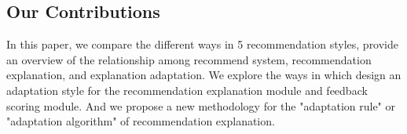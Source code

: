 \subsection{Our Contributions}
In this paper, we compare the different ways in 5 recommendation styles, provide an overview of the relationship among recommend system, recommendation explanation, and explanation adaptation. We explore the ways in which design an adaptation style for the recommendation explanation module and feedback scoring module. And we propose a new methodology for the "adaptation rule" or "adaptation algorithm" of recommendation explanation.

\cleardoublepage